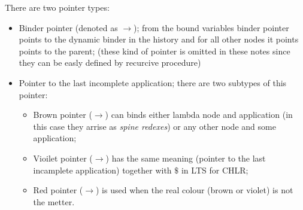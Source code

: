 \documentclass[a4paper, 10pt]{article}
\begin{document}
There are two pointer types:
\begin{itemize}
\item Binder pointer (denoted as {\color{green}$\rightarrow$});
  from the bound variables binder pointer points to the dynamic binder in the history
  and for all other nodes it points points to the parent;
  (these kind of pointer is omitted in these notes since they can
  be easly defined by recurcive procedure)
\item Pointer to the last incomplete application; there are two subtypes
  of this pointer:
  \begin{itemize}
  \item Brown pointer ({\color{brown}$\rightarrow$}) can binds either
    lambda node and application (in this case they arrise as \emph{spine redexes})
    or any other node and some application;
  \item Vioilet pointer ({\color{violet}$\rightarrow$}) has the same meaning
    (pointer to the last incamplete application) together with $\$$
    in LTS for CHLR;
  \item Red pointer ({\color{red}$\rightarrow$}) is used when the real colour
    (brown or violet) is not the metter.    
  \end{itemize}
\end{itemize}
\end{document}
